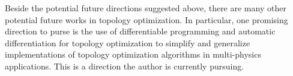 Beside the potential future directions suggested above, there are many other potential future works in topology optimization. In particular, one promising direction to purse is the use of differentiable programming and automatic differentiation for topology optimization to simplify and generalize implementations of topology optimization algorithms in multi-physics applications. This is a direction the author is currently pursuing.

